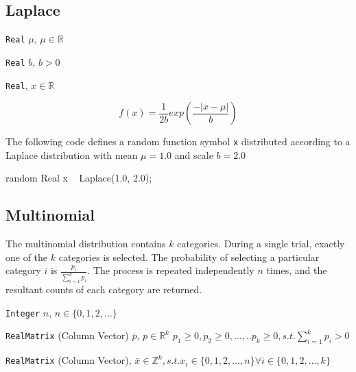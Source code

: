 \subsection{Laplace}

\begin{itemize*}
\item[] \verb|Real| $\mu$, $\mu \in \mathbb{R}$
\item[] \verb|Real| $b$, $b > 0$

\end{itemize*}

\begin{itemize*}
\item[] \verb|Real|, $x \in \mathbb{R}$
\end{itemize*}

\[
	f(x) = \frac{1}{2b} exp(\frac{-|x-\mu|}{b})
\]

The following code defines a random function symbol \verb|x| distributed according to a Laplace distribution with mean $\mu = 1.0$ and scale $b = 2.0$
\begin{blogcode}
random Real x ~ Laplace(1.0, 2.0);
\end{blogcode}


\subsection{Multinomial}
 The multinomial distribution contains $k$ categories. During a single trial, exactly one of the $k$ categories is selected. The probability of selecting a particular category $i$ is $\frac{p_{i}}{\sum_{i=1}^{k} p_{i}}$. The process is repeated independently $n$ times, and the resultant counts of each category are returned.

\begin{itemize*}
\item[] \verb|Integer| $n$, $n \in \{0, 1, 2, \ldots \}$
\item[] \verb|RealMatrix| (Column Vector) $\bar{p}$, $p \in \mathbb{R}^{k}$ $p_{1} \geq 0, p_{2} \geq 0, \ldots, .. p_{k} \geq 0, s.t. \sum_{i=1}^{k} p_{i} > 0$
\end{itemize*}

\begin{itemize*}
\item[] \verb|RealMatrix| (Column Vector), $\bar{x} \in \mathbb{Z}^{k}, s.t. x_{i} \in \{0, 1, 2, \ldots, n \} \forall i \in \{0, 1, 2, \ldots, k \}  $
\end{itemize*}

